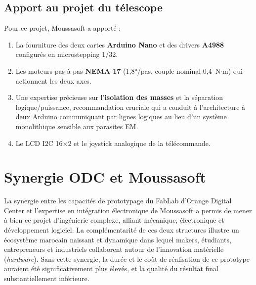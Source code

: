\documentclass[12pt,a4paper]{report}
\begin{document}
\subsection{Apport au projet du télescope}
Pour ce projet, Moussasoft a apporté :
\begin{enumerate}
    \item La fourniture des deux cartes \textbf{Arduino Nano} et des drivers \textbf{A4988} configurés en microstepping 1/32.
    \item Les moteurs pas-à-pas \textbf{NEMA 17} (1{,}8°/pas, couple nominal 0{,}4~N$\cdot$m) qui actionnent les deux axes.
    \item Une expertise précieuse sur l'\textbf{isolation des masses} et la séparation logique/puissance, recommandation cruciale qui a conduit à l'architecture à deux Arduino communiquant par lignes logiques au lieu d'un système monolithique sensible aux parasites EM.
    \item Le LCD I2C 16$\times$2 et le joystick analogique de la télécommande.
\end{enumerate}



\section{Synergie ODC et Moussasoft}
La synergie entre les capacités de prototypage du FabLab d'Orange Digital Center et l'expertise en intégration électronique de Moussasoft a permis de mener à bien ce projet d'ingénierie complexe, alliant mécanique, électronique et développement logiciel. La complémentarité de ces deux structures illustre un écosystème marocain naissant et dynamique dans lequel makers, étudiants, entrepreneurs et industriels collaborent autour de l'innovation matérielle (\textit{hardware}). Sans cette synergie, la durée et le coût de réalisation de ce prototype auraient été significativement plus élevés, et la qualité du résultat final substantiellement inférieure.
\end{document}

